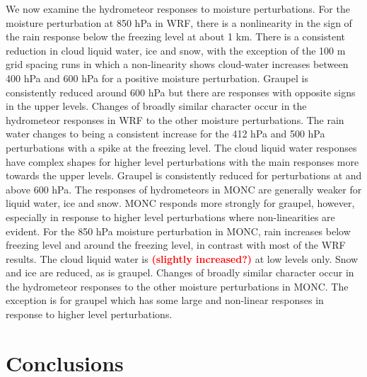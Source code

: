 \documentclass[draft]{agujournal2019}
\newcommand{\todo}[1]{\textcolor{red}{\textbf{(#1)}}}
\begin{document}
We now examine the hydrometeor responses to moisture perturbations. For the
moisture perturbation at 850 hPa in WRF, there is a nonlinearity in the sign of
the rain response below the freezing level at about 1 km. There is a consistent
reduction in cloud liquid water, ice and snow, with the exception of the 100 m
grid spacing runs in which a non-linearity shows cloud-water increases between
400 hPa and 600 hPa for a positive moisture perturbation. Graupel is
consistently reduced around 600 hPa but there are responses with opposite signs
in the upper levels. Changes of broadly similar character occur in the
hydrometeor responses in WRF to the other moisture perturbations. The rain water
changes to being a consistent increase for the 412 hPa and 500 hPa perturbations
with a spike at the freezing level. The cloud liquid water responses have
complex shapes for higher level perturbations with the main responses more
towards the upper levels. Graupel is consistently reduced for perturbations at
and above 600 hPa. The responses of hydrometeors in MONC are generally weaker
for liquid water, ice and snow. MONC responds more strongly for graupel,
however, especially in response to higher level perturbations where
non-linearities are evident. For the 850 hPa moisture perturbation in MONC, rain
increases below freezing level and around the freezing level, in contrast with
most of the WRF results. The cloud liquid water is \todo{slightly increased?} at
low levels only. Snow and ice are reduced, as is graupel. Changes of broadly
similar character occur in the hydrometeor responses to the other moisture
perturbations in MONC. The exception is for graupel which has some large and
non-linear responses in response to higher level perturbations. 

\section{Conclusions}
\label{sec:conclusions}

%
%

\end{document}
